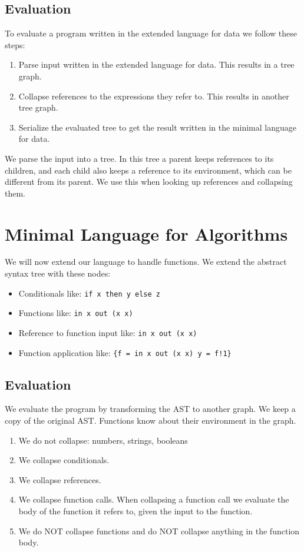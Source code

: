 \documentclass[a4paper,12pt]{article}
\begin{document}
\subsection{Evaluation}

To evaluate a program written in the extended language for data we follow these steps:
\begin{enumerate}
\item Parse input written in the extended language for data. This results in a tree graph.
\item Collapse references to the expressions they refer to. This results in another tree graph.
\item Serialize the evaluated tree to get the result written in the minimal language for data.
\end{enumerate}
We parse the input into a tree. In this tree a parent keeps references to its children, and each child also keeps a reference to its environment, which can be different from its parent. We use this when looking up references and collapsing them.

\section{Minimal Language for Algorithms}

We will now extend our language to handle functions. We extend the abstract syntax tree with these nodes:
\begin{itemize}
\item Conditionals like: \lstinline|if x then y else z|
\item Functions like: \lstinline|in x out (x x)|
\item Reference to function input like: \lstinline|in x out (x x)|
\item Function application like: \lstinline|{f = in x out (x x) y = f!1}|
\end{itemize}

\subsection{Evaluation}

We evaluate the program by transforming the AST to another graph. We keep a copy of the original AST. Functions know about their environment in the graph.
\begin{enumerate}
\item We do not collapse: numbers, strings, booleans
\item We collapse conditionals.
\item We collapse references.
\item We collapse function calls. When collapsing a function call we evaluate the body of the function it refers to, given the input to the function.
\item We do NOT collapse functions and do NOT collapse anything in the function body.
\end{enumerate}
\end{document}
